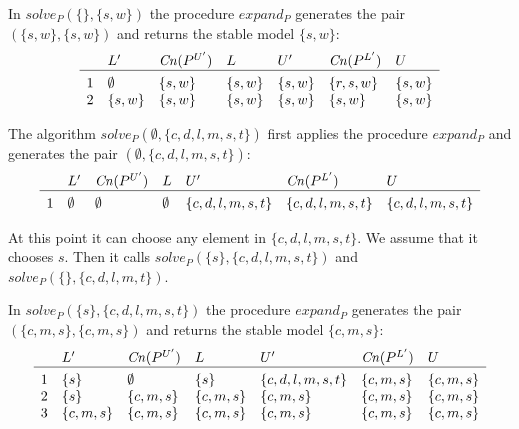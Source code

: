 \begin{Loesung}
{\begin{UList}
In $solve_P(\{\},\{s,w\})$
the procedure $expand_P$ generates the pair
$(\{s,w\},\{s,w\})$
and returns the stable model
$\{s,w\}$:
\[
\begin{array}{c@{\hspace{10pt}}llllll}
& L' & \mathit{Cn}(P^{U'}) & L
& U' & \mathit{Cn}(P^{L'}) & U \\\hline\\[-3mm]
1 & \emptyset & \{s,w\} & \{s,w\} & \{s,w\} & \{r,s,w\} & \{s,w\} \\ 
2 & \{s,w\} & \{s,w\} & \{s,w\} & \{s,w\} & \{s,w\} & \{s,w\} \\ 
\end{array}
\]
%

\item
The algorithm $solve_P(\emptyset, \{c,d,l,m,s,t\})$ 
first applies the procedure $expand_P$ and
generates the pair $(\emptyset, \{c,d,l,m,s,t\})$:
\[
\begin{array}{c@{\hspace{10pt}}llllll}
& L' & \mathit{Cn}(P^{U'}) & L
& U' & \mathit{Cn}(P^{L'}) & U \\\hline\\[-3mm]
1 & \emptyset & \emptyset & \emptyset & \{c,d,l,m,s,t\} & \{c,d,l,m,s,t\} & \{c,d,l,m,s,t\} \\ 
\end{array}
\]

At this point it can choose any element in $\{c,d,l,m,s,t\}$.
We assume that it chooses $s$.
Then it calls $solve_P(\{s\},\{c,d,l,m,s,t\})$ and $solve_P(\{\},\{c,d,l,m,t\})$.

In $solve_P(\{s\},\{c,d,l,m,s,t\})$ 
the procedure $expand_P$ generates the pair
\\
$(\{c,m,s\},\{c,m,s\})$ 
and returns the stable model $\{c,m,s\}$:
\[
\begin{array}{c@{\hspace{10pt}}llllll}
& L' & \mathit{Cn}(P^{U'}) & L
& U' & \mathit{Cn}(P^{L'}) & U \\\hline\\[-3mm]
1 & \{s\} & \emptyset & \{s\} & \{c,d,l,m,s,t\} & \{c,m,s\} & \{c,m,s\} \\ 
2 & \{s\} & \{c,m,s\} & \{c,m,s\} & \{c,m,s\} & \{c,m,s\} & \{c,m,s\} \\ 
3 & \{c,m,s\} & \{c,m,s\} & \{c,m,s\} & \{c,m,s\} & \{c,m,s\} & \{c,m,s\} \\ 
\end{array}
\]


\end{UList}}
\end{Loesung}
